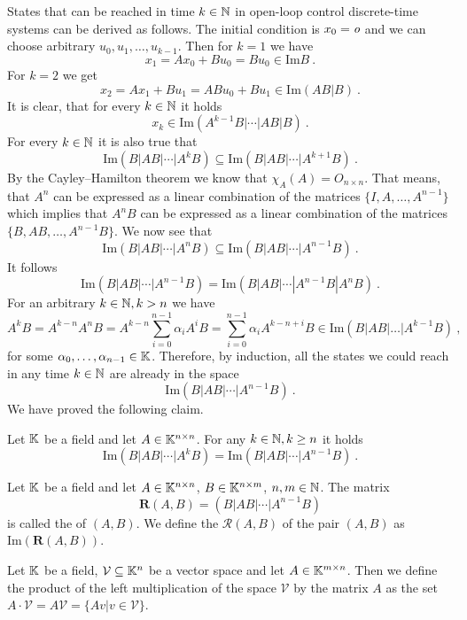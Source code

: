 \sloppy
States that can be reached in time $k\in\mathbb{N}$ in open-loop control discrete-time systems can be derived as follows. The initial condition is $x_0=\textit{o}$ and we can choose arbitrary $u_0,u_1,\ldots,u_{k-1}$. Then for $k=1$ we have 
$$x_1=Ax_0+Bu_0=Bu_0 \in \text{Im}B\ .$$
For $k=2$ we get
$$x_2=Ax_1+Bu_1=ABu_0+Bu_1\in\text{Im}(AB|B)\ .$$
It is clear, that for every $k\in\mathbb{N}$ it holds
$$x_k\in\text{Im}(A^{k-1}B|\cdots|AB|B)\ .$$
For every $k\in\mathbb{N}$ it is also true that
$$\text{Im}(B|AB|\cdots|A^kB) \subseteq \text{Im}(B|AB|\cdots|A^{k+1}B)\ .$$
By the Cayley–Hamilton theorem we know that $\chi_A(A)=O_{n\times n}$. That means, that $A^n$ can be expressed as a linear combination of the matrices $\{I,A,\ldots,A^{n-1}\}$ which implies that $A^nB$ can be expressed as a linear combination of the matrices $\{B,AB,\ldots,A^{n-1}B\}$. We now see that $$\text{Im}(B|AB|\cdots|A^{n}B) \subseteq \text{Im}(B|AB|\cdots|A^{n-1}B)\ .$$
It follows
\begin{equation*}
	\text{Im}(B|AB|\cdots|A^{n-1}B)=\text{Im}(B|AB|\cdots|A^{n-1}B|A^nB)\ .
\end{equation*}
For an arbitrary $k\in\mathbb{N},k>n$ we have $$A^kB=A^{k-n}A^nB=A^{k-n}\sum^{n-1}_{i=0}\alpha_i A^iB=\sum^{n-1}_{i=0}\alpha_i A^{k-n+i}B\in\text{Im}(B|AB|\ldots|A^{k-1}B)\ ,$$
for some $\alpha_0,\ldots,\alpha_{n-1}\in\mathbb{K}$.
Therefore, by induction, all the states we could reach in any time $k\in\mathbb{N}$ are already in the space 
$$\text{Im}(B|AB|\cdots|A^{n-1}B)\ .$$
We have proved the following claim.

\begin{claim}
\label{clm:cayley}
	Let $\mathbb{K}$ be a field and let $A\in\mathbb{K}^{n\times n}$. For any $k\in\mathbb{N},k\geq n$ it holds $$\text{Im}(B|AB|\cdots|A^kB)=\text{Im}(B|AB|\cdots|A^{n-1}B)\ .$$
\end{claim}

\begin{definition}
	Let $\mathbb{K}$ be a field and let $A \in \mathbb{K}^{n \times n}$, $B \in \mathbb{K}^{n \times m}$, $n,m \in \mathbb{N}$. The matrix $$\mathbf{R}(A,B)=(B|AB|\cdots|A^{n-1}B)$$ is called the  of $(A,B)$. We define the  $\mathcal{R}(A,B)$ of the pair $(A,B)$ as $\text{Im}(\mathbf{R}(A,B))$. 
\end{definition}

\begin{definition}
	Let $\mathbb{K}$ be a field, $\mathcal{V} \subseteq \mathbb{K}^n$ be a vector space and let $A\in\mathbb{K}^{m\times n}$. Then we define the product of the left multiplication of the space $\mathcal{V}$ by the matrix $A$ as the set $A\cdot\mathcal{V}=A\mathcal{V}=\{Av|v\in\mathcal{V}\}$.
\end{definition}

